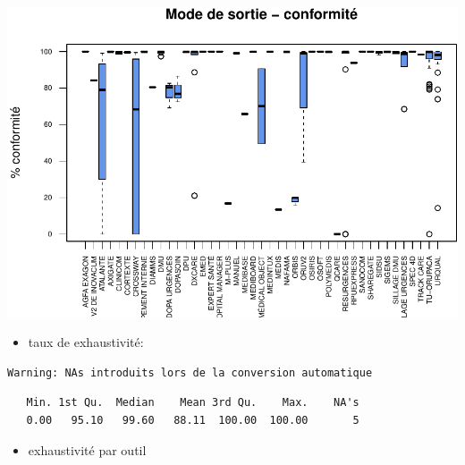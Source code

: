 \documentclass[]{article}
\providecommand{\tightlist}{%
  \setlength{\itemsep}{0pt}\setlength{\parskip}{0pt}}
\begin{document}
\includegraphics{septembre2015_files/figure-latex/unnamed-chunk-22-1.pdf}

\begin{itemize}
\tightlist
\item
  taux de exhaustivité:
\end{itemize}

\begin{verbatim}
Warning: NAs introduits lors de la conversion automatique
\end{verbatim}

\begin{verbatim}
   Min. 1st Qu.  Median    Mean 3rd Qu.    Max.    NA's 
   0.00   95.10   99.60   88.11  100.00  100.00       5 
\end{verbatim}

\begin{itemize}
\tightlist
\item
  exhaustivité par outil
\end{itemize}
\end{document}
